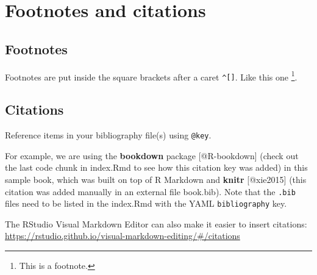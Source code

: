 \documentclass[
]{article}
\author{}
\date{\vspace{-2.5em}}
\begin{document}
\hypertarget{footnotes-and-citations}{%
\section{Footnotes and citations}\label{footnotes-and-citations}}

\hypertarget{footnotes}{%
\subsection{Footnotes}\label{footnotes}}

Footnotes are put inside the square brackets after a caret
\texttt{\^{}{[}{]}}. Like this one \footnote{This is a footnote.}.

\hypertarget{citations}{%
\subsection{Citations}\label{citations}}

Reference items in your bibliography file(s) using \texttt{@key}.

For example, we are using the \textbf{bookdown} package
{[}@R-bookdown{]} (check out the last code chunk in index.Rmd to see how
this citation key was added) in this sample book, which was built on top
of R Markdown and \textbf{knitr} {[}@xie2015{]} (this citation was added
manually in an external file book.bib). Note that the \texttt{.bib}
files need to be listed in the index.Rmd with the YAML
\texttt{bibliography} key.

The RStudio Visual Markdown Editor can also make it easier to insert
citations:
\url{https://rstudio.github.io/visual-markdown-editing/\#/citations}
\end{document}
